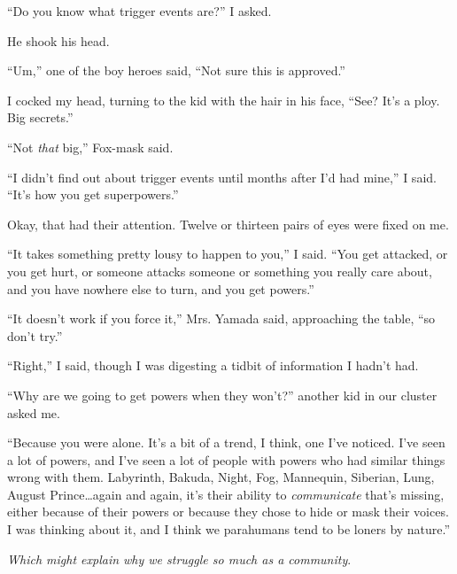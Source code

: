 ``Do you know what trigger events are?'' I asked.



He shook his head.



``Um,'' one of the boy heroes said, ``Not sure this is approved.''



I cocked my head, turning to the kid with the hair in his face, ``See?  It's a ploy.  Big secrets.''



``Not \emph{that} big,'' Fox-mask said.



``I didn't find out about trigger events until months after I'd had mine,'' I said.  ``It's how you get superpowers.''



Okay, that had their attention.  Twelve or thirteen pairs of eyes were fixed on me.



``It takes something pretty lousy to happen to you,'' I said.  ``You get attacked, or you get hurt, or someone attacks someone or something you really care about, and you have nowhere else to turn, and you get powers.''



``It doesn't work if you force it,'' Mrs. Yamada said, approaching the table, ``so don't try.''



``Right,'' I said, though I was digesting a tidbit of information I hadn't had.



``Why are we going to get powers when they won't?'' another kid in our cluster asked me.



``Because you were alone.  It's a bit of a trend, I think, one I've noticed.  I've seen a lot of powers, and I've seen a lot of people with powers who had similar things wrong with them.  Labyrinth, Bakuda, Night, Fog, Mannequin, Siberian, Lung, August Prince\ldots again and again, it's their ability to \emph{communicate} that's missing, either because of their powers or because they chose to hide or mask their voices.  I was thinking about it, and I think we parahumans tend to be loners by nature.''



\emph{Which might explain why we struggle so much as a community}.



